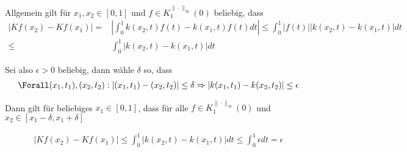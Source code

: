 \begin{solution}
\begin{enumerate}
Allgemein gilt für $x_1, x_2 \in [0,1]$ und $f \in K_{1}^{\|\cdot\|_{\infty}}(0)$ beliebig, dass
\begin{align*}
  |Kf(x_2) - Kf(x_1)| =& | \int_{0}^{1} k(x_2,t)f(t) - k(x_1,t)f(t) dt| \leq \int_{0}^{1} |f(t)||k(x_2,t)- k(x_1,t)|dt \\
  \leq& \int_{0}^{1} |k(x_2,t)- k(x_1,t)|dt
\end{align*}

Sei also $\epsilon > 0$ beliebig, dann wähle $\delta$ so, dass
\begin{align*}
  \Forall (x_1,t_1),(x_2,t_2): | (x_1,t_1) - (x_2,t_2)| \leq \delta \Rightarrow | k(x_1,t_1) - k(x_2,t_2)| \leq \epsilon
\end{align*}

Dann gilt für beliebiges $x_1 \in [0,1]$, dass für alle $f \in K_{1}^{\|\cdot\|_{\infty}}(0)$ und $x_2 \in [x_1-\delta,x_1+\delta]$

\begin{align*}
  |Kf(x_2) - Kf(x_1)| \leq \int_{0}^{1} |k(x_2,t)- k(x_1,t)|dt \leq \int_{0}^{1} \epsilon dt = \epsilon
\end{align*}

 \end{enumerate}


\end{solution}
